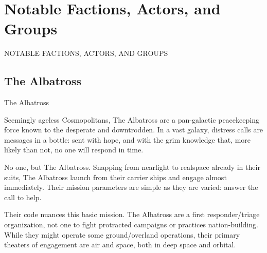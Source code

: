 \chapter{Notable Factions, Actors, and Groups}


                                                  NOTABLE FACTIONS,  
                                                  ACTORS, AND  
                                                  GROUPS  
\section{The Albatross}
                                                  The Albatross  

                                                  Seemingly ageless Cosmopolitans, The Albatross  
                                                  are a pan-galactic peacekeeping force known to the  
                                                  desperate and downtrodden. In a vast galaxy,  
                                                  distress calls are messages in a bottle: sent with  
                                                  hope, and with the grim knowledge that, more likely  
                                                  than not, no one will respond in time. 
 

                                                  No one, but The Albatross. Snapping from nearlight  
                                                  to realspace already in their suits, The Albatross  
                                                  launch from their carrier ships and engage almost  
                                                  immediately. Their mission parameters are simple as  
                                                  they are varied: answer the call to help. 
 

                                                  Their code nuances this basic mission. The  
                                                  Albatross are a first responder/triage organization,  
                                                  not one to fight protracted campaigns or practices  
                                                  nation-building. While they might operate some  
                                                  ground/overland operations, their primary theaters  
                                                  of engagement are air and space, both in deep  
                                                  space and orbital.  
 

